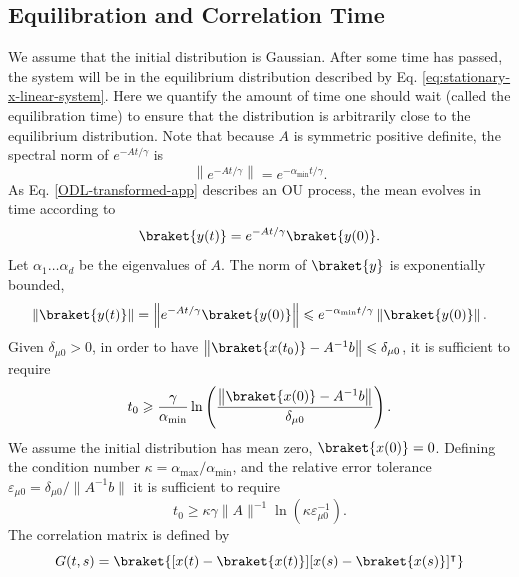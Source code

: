 \documentclass[prx,onecolumn,floatfix,longbibliography,notitlepage, nofootinbib,12pt]{revtex4-2}
\renewcommand{\geq}{\geqslant}
\renewcommand{\leq}{\leqslant}
\begin{document}
\begin{appendix}
\subsection{Equilibration and Correlation Time}
We assume that the initial distribution is Gaussian. After some time has passed, the system will be in the equilibrium distribution described by Eq. \eqref{eq:stationary-x-linear-system}. Here we quantify the amount of time one should wait (called the equilibration time) to ensure that the distribution is arbitrarily close to the equilibrium distribution. Note that because $A$ is symmetric positive definite, the spectral norm of $e^{-A t/\gamma}$ is
\begin{equation}
\label{exp-A-norm-bound-app}
    \left\|e^{-A t/\gamma}\right\| = e^{-\alpha_\text{min} t/\gamma}.
\end{equation}
As Eq. \eqref{ODL-transformed-app} describes an OU process, the mean evolves in time according to
\begin{equation}
    \braket{y(t)} = e^{-A t/\gamma}\braket{y(0)}.
\end{equation}
Let $\alpha_1 \dots \alpha_d$ be the eigenvalues of $A$. The norm of $\braket{y}$ is exponentially bounded,
\begin{equation}
\label{odl-mean-exp-bound-app}
\left\|\braket{y(t)}\right\| =\left \|e^{- A t/\gamma} \braket{ y(0)}\right\| \leq e^{-\alpha_\text{min} t/\gamma} \left\| \braket{y(0)}\right\|.
\end{equation} 
Given $\delta_{\mu 0}>0$, in order to have $\left\|\braket{x(t_0)} -A^{-1} b\right \| \leq \delta_{\mu 0}$, it is sufficient to require
\begin{equation}
    t_0 \geq \frac{\gamma}{\alpha_\text{min}} \ln \left( \frac{\left\|\braket{x(0)} - A^{-1} b\right\|}{\delta_{\mu0}}\right).
\end{equation}
We assume the initial distribution has mean zero, $\braket{x(0)}=0$. Defining the condition number $\kappa = \alpha_\text{max}/\alpha_\text{min}$, and the relative error tolerance $\varepsilon_{\mu 0} = \delta_{\mu 0 }/\|A^{-1} b\|$ it is sufficient to require
\begin{equation}
\label{eq:odl-mean-equilibration-time-app}
    t_0 \geq \kappa \gamma \|A\|^{-1} \ln \left(\kappa \varepsilon^{-1}_{\mu 0}\right).
\end{equation}
The correlation matrix is defined by
\begin{equation}
    G(t,s) = \braket{[x(t) - \braket{x(t)}][x(s) - \braket{x(s)}]^\intercal}
\end{equation}

\end{appendix}
\end{document}

